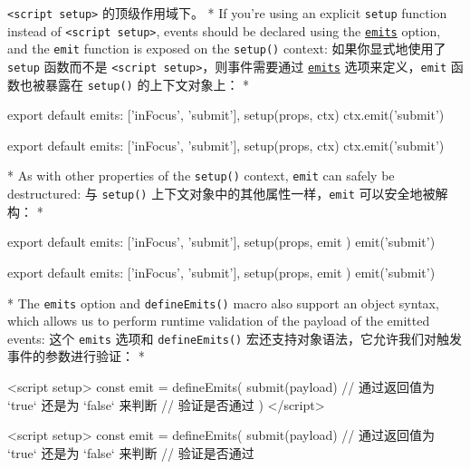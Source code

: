\begin{paracol}{2}
\texttt{\textless{}script\ setup\textgreater{}} 的顶级作用域下。
\switchcolumn[0]*%
If you're using an explicit \texttt{setup} function instead of
\texttt{\textless{}script\ setup\textgreater{}}, events should be
declared using the
\href{https://vuejs.org/api/options-state.html\#emits}{\texttt{emits}}
option, and the \texttt{emit} function is exposed on the
\texttt{setup()} context:
\switchcolumn
如果你显式地使用了 \texttt{setup} 函数而不是
\texttt{\textless{}script\ setup\textgreater{}}，则事件需要通过
\href{https://cn.vuejs.org/api/options-state.html\#emits}{\texttt{emits}}
选项来定义，\texttt{emit} 函数也被暴露在 \texttt{setup()}
的上下文对象上：
\switchcolumn[0]*%
\begin{codeJs}
export default {
  emits: ['inFocus', 'submit'],
  setup(props, ctx) {
    ctx.emit('submit')
  }
}
\end{codeJs}
\switchcolumn
\begin{codeJs}
export default {
  emits: ['inFocus', 'submit'],
  setup(props, ctx) {
    ctx.emit('submit')
  }
}
\end{codeJs}
\switchcolumn[0]*%
As with other properties of the \texttt{setup()} context, \texttt{emit}
can safely be destructured:
\switchcolumn
与 \texttt{setup()} 上下文对象中的其他属性一样，\texttt{emit}
可以安全地被解构：
\switchcolumn[0]*%
\begin{codeJs}
export default {
  emits: ['inFocus', 'submit'],
  setup(props, { emit }) {
    emit('submit')
  }
}
\end{codeJs}
\switchcolumn
\begin{codeJs}
export default {
  emits: ['inFocus', 'submit'],
  setup(props, { emit }) {
    emit('submit')
  }
}
\end{codeJs}
\switchcolumn[0]*%
The \texttt{emits} option and \texttt{defineEmits()} macro also support
an object syntax, which allows us to perform runtime validation of the
payload of the emitted events:
\switchcolumn
这个 \texttt{emits} 选项和 \texttt{defineEmits()}
宏还支持对象语法，它允许我们对触发事件的参数进行验证：
\switchcolumn[0]*%
\begin{codeHtml}
<script setup>
const emit = defineEmits({
  submit(payload) {
    // 通过返回值为 `true` 还是为 `false` 来判断
    // 验证是否通过
  }
})
</script>
\end{codeHtml}
\switchcolumn
\begin{codeHtml}
<script setup>
const emit = defineEmits({
  submit(payload) {
    // 通过返回值为 `true` 还是为 `false` 来判断
    // 验证是否通过
}}
\end{codeHtml}
\end{paracol}
